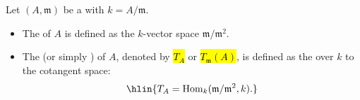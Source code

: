 \begin{definition} \label{definition:zariski_cotangent_space_of_tangent_space_of_a_local_ring}
Let $(A, \mathfrak{m})$ be a  with  $k = A/\mathfrak{m}$.
\begin{itemize}
    \item The  of $A$ is defined as the $k$-vector space $\mathfrak{m}/\mathfrak{m}^2$.

    \item The  (or simply ) of $A$, denoted by \hl{$T_A$} or \hl{$T_{\mathfrak{m}}(A)$}, is defined as the  over $k$ to the cotangent space:
    $$\hlin{T_A = \operatorname{Hom}_k(\mathfrak{m}/\mathfrak{m}^2, k).}$$
\end{itemize}
\end{definition}